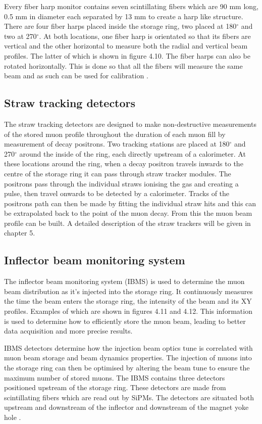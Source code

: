 Every fiber harp monitor contains seven scintillating fibers which are 90 mm long, 0.5 mm in diameter each separated by 13 mm to create a harp like structure. There are four fiber harps placed inside the storage ring, two placed at 180$^{\circ}$ and two at 270$^{\circ}$. At both locations, one fiber harp is orientated so that its fibers are vertical and the other horizontal to measure both the radial and vertical beam profiles. The latter of which is shown in figure 4.10. The fiber harps can also be rotated horizontally. This is done so that all the fibers will measure the same beam and as such can be used for calibration \cite{fiberref1}.

\subsection{Straw tracking detectors}

The straw tracking detectors are designed to make non-destructive measurements of the stored muon profile throughout the duration of each muon fill by measurement of decay positrons. Two tracking stations are placed at 180$^{\circ}$ and 270$^{\circ}$ around the inside of the ring, each directly upstream of a calorimeter. At these locations around the ring, when a decay positron travels inwards to the centre of the storage ring it can pass through straw tracker modules. The positrons pass through the individual straws ionising the gas and creating a pulse, then travel onwards to be detected by a calorimeter. Tracks of the positrons path can then be made by fitting the individual straw hits and this can be extrapolated back to the point of the muon decay. From this the muon beam profile can be built. A detailed description of the straw trackers will be given in chapter 5.

\subsection{Inflector beam monitoring system}

The inflector beam monitoring system (IBMS) is used to determine the muon beam distribution as it's injected into the storage ring. It continuously measures the time the beam enters the storage ring, the intensity of the beam and its XY profiles. Examples of which are shown in figures 4.11 and 4.12. This information is used to determine how to efficiently store the muon beam, leading to better data acquisition and more precise results. 

IBMS detectors determine how the injection beam optics tune is correlated with muon beam storage and beam dynamics properties. The injection of muons into the storage ring can then be optimised by altering the beam tune to ensure the maximum number of stored muons. The IBMS contains three detectors positioned upstream of the storage ring. These detectors are made from scintillating fibers which are read out by SiPMs. The detectors are situated both upstream and downstream of the inflector and downstream of the magnet yoke hole \cite{ibmsref1}\cite{ibmsref2}.  

